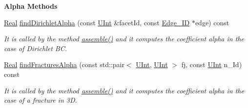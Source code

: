 \begin{Indent}{\bf Alpha Methods}
\begin{DoxyCompactItemize}
\hyperlink{namespaceFVCode3D_a40c1f5588a248569d80aa5f867080e83}{Real} \hyperlink{classFVCode3D_1_1StiffMatrix_a478ef47118fb9c83531695e0eaaa62a6}{find\+Dirichlet\+Alpha} (const \hyperlink{namespaceFVCode3D_a4bf7e328c75d0fd504050d040ebe9eda}{U\+Int} \&facet\+Id, const \hyperlink{classFVCode3D_1_1StiffMatrix_ac82be26370aa6eb17714078d9a2bf8df}{Edge\+\_\+\+ID} $\ast$edge) const 
\begin{DoxyCompactList}\small\item\em It is called by the method \hyperlink{classFVCode3D_1_1StiffMatrix_af63e81815a2ba8bd62a2156a80adce55}{assemble()} and it computes the coefficient alpha in the case of Dirichlet BC. \end{DoxyCompactList}\item 
\hyperlink{namespaceFVCode3D_a40c1f5588a248569d80aa5f867080e83}{Real} \hyperlink{classFVCode3D_1_1StiffMatrix_a53ce514c7a4c784061b5339350e00995}{find\+Fractures\+Alpha} (const std\+::pair$<$ \hyperlink{namespaceFVCode3D_a4bf7e328c75d0fd504050d040ebe9eda}{U\+Int}, \hyperlink{namespaceFVCode3D_a4bf7e328c75d0fd504050d040ebe9eda}{U\+Int} $>$ fj, const \hyperlink{namespaceFVCode3D_a4bf7e328c75d0fd504050d040ebe9eda}{U\+Int} n\+\_\+\+Id) const 
\begin{DoxyCompactList}\small\item\em It is called by the method \hyperlink{classFVCode3D_1_1StiffMatrix_af63e81815a2ba8bd62a2156a80adce55}{assemble()} and it computes the coefficient alpha in the case of a fracture in 3D. \end{DoxyCompactList}\end{DoxyCompactItemize}
\end{Indent}
